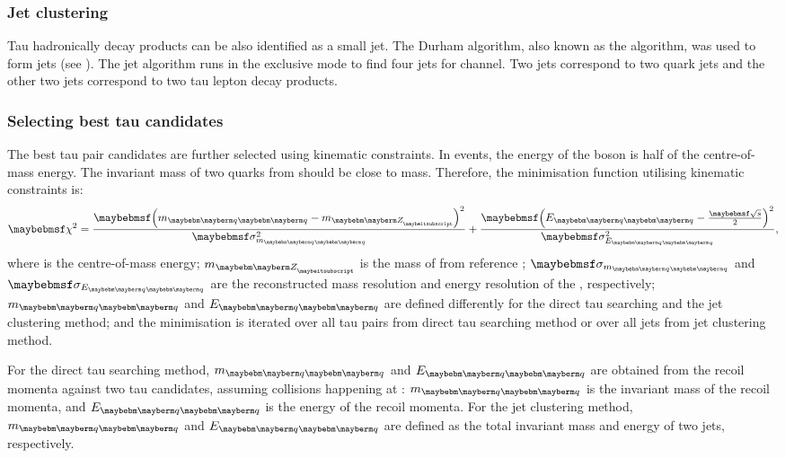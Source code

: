 \subsubsection{Jet clustering}

Tau hadronically decay products can be also identified as a small jet. The Durham algorithm, also known as the \ee \kt algorithm, was used to form  jets (see ). The jet algorithm runs in the exclusive mode to find four jets for \eeZZQQ channel. Two jets correspond to two quark jets and the other two jets correspond to two tau lepton decay products. 

\subsubsection{Selecting best tau candidates}

The best tau pair candidates are further selected using kinematic constraints. In  \HepProcess{\Pep \Pem \to \PZ \PZ} events, the energy of the \PZ boson is half of the centre-of-mass energy. The invariant mass of two quarks from \PZ should be close to \PZ mass. Therefore, the minimisation function utilising kinematic constraints is:
\begin{equation}
\chi^2 = \frac{\parenths{m_{\Pquark\Pquark} - m_{\PZ}}^2}{\sigma_{m_{\Pquark\Pquark}}^2} + \frac{\parenths{E_{\Pquark\Pquark} - \frac{\sqrtS}{2}}^2}{\sigma_{E_{\Pquark\Pquark}}^2},
\label{eq:tauMinimiser}
\end{equation}
where \sqrtS is the centre-of-mass energy; $m_{\PZ}$ is the mass of \PZ from reference \cite{Agashe:2014kda}; $\sigma_{m_{\Pquark\Pquark}}$ and $\sigma_{E_{\Pquark\Pquark}}$ are the reconstructed mass resolution  and energy resolution of the \ZToqq, respectively;  $m_{\Pquark\Pquark}$ and  $E_{\Pquark\Pquark}$ are defined differently for the direct tau searching and the jet clustering method; and the minimisation is iterated over all tau pairs from direct tau searching method or over all jets from jet clustering method. 

For the direct tau searching method, $m_{\Pquark\Pquark}$ and  $E_{\Pquark\Pquark}$ are obtained from the recoil momenta against two tau candidates, assuming collisions happening at \sqrtS: $m_{\Pquark\Pquark}$ is the invariant mass of the recoil momenta, and   $E_{\Pquark\Pquark}$ is the energy of the recoil momenta. For the jet clustering method,  $m_{\Pquark\Pquark}$ and  $E_{\Pquark\Pquark}$ are defined as the total invariant mass and energy of two jets, respectively.

